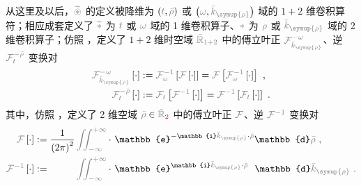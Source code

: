 从这里及以后，$\mathcolor{gray}{\widetilde \circledast}$ 的定义被降维为 $\left( \mathcolor{gray}{t}, \mathcolor{gray}{\bar{\rho}} \right)$ 或 $\left( \mathcolor{gray}{\omega}, \mathcolor{gray}{\bar{k}_{\symup{\rho}}} \right)$ 域的 $1+2$ 维卷积算符；相应成套定义了 $\mathcolor{gray}{\widetilde *}$ 为 $\mathcolor{gray}{t}$ 或 $\mathcolor{gray}{\omega}$ 域的 1 维卷积算子、$\mathcolor{gray}{*}$ 为 $\mathcolor{gray}{\rho}$ 或 $\mathcolor{gray}{\bar{k}_{\symup{\rho}}}$ 域的 2 维卷积算子；仿照 ，定义了 $1+2$ 维时空域 $\mathcolor{gray}{\bar{\mathbb{R}}_{1+2}}$ 中的傅立叶正 $\mathcolor{gray}{\mathcal F_{\bar{k}_{\symup{\rho}}}^{-\omega}}$、逆 $\mathcolor{gray}{\mathcal F^{-\bar{\rho}}_{t}}$ 变换对
\begin{subequations} \label{eq:FT-trho_wkrho}
	\abovedisplayskip=4pt
	\belowdisplayskip=6pt
\begin{align}
	\mathcolor{gray}{\mathcal F_{\bar{k}_{\symup{\rho}}}^{-\omega}} \left[ \cdot \right] &:= \mathcolor{gray}{\mathcal F_{\omega}^{-1}} \left[ \mathcolor{gray}{\mathcal F} \left[ \cdot \right] \right] = \mathcolor{gray}{\mathcal F} \left[ \mathcolor{gray}{\mathcal F_{\omega}^{-1}} \left[ \cdot \right] \right] ~, \label{eq:FT-wkrho} \\
	\mathcolor{gray}{\mathcal F^{-\bar{\rho}}_{t}} \left[ \cdot \right] &:= \mathcolor{gray}{\mathcal F_{t}} \left[ \mathcolor{gray}{\mathcal F^{-1}} \left[ \cdot \right] \right] = \mathcolor{gray}{\mathcal F^{-1}} \left[ \mathcolor{gray}{\mathcal F_{t}} \left[ \cdot \right] \right] ~. \label{eq:IFT-trho}
\end{align}
\end{subequations}
其中，仿照 ，定义了 2 维空域 $\mathcolor{gray}{\bar{\rho}} \in \mathcolor{gray}{\bar{\mathbb{R}}_{\textcolor{Maroon}{2}}}$ 中的傅立叶正 $\mathcolor{gray}{\mathcal F}$、逆 $\mathcolor{gray}{\mathcal F^{-1}}$ 变换对
\begin{subequations} \label{eq:FT-rho_krho}
	\belowdisplayskip=8pt
\begin{align}
	\mathcolor{gray}{\mathcal F} \left[ \cdot \right] &:= \frac{ 1 }{ \left( 2\pi \right)^2 } \mathcolor{gray}{\iint_{-\infty}^{+\infty}} \cdot~ \mathbb{e}^{-\mathbb{i}\mathcolor{gray}{\bar{k}_{\symup{\rho}}} \cdot \mathcolor{gray}{\bar{\rho}}} \mathbb{d}\mathcolor{gray}{\bar{\rho}} ~, \label{eq:FT-krho} \\
	\mathcolor{gray}{\mathcal F^{-1}} \left[ \cdot \right] &:= \hphantom{\frac{ 1 }{ \left( 2\pi \right)^3 }} \mathcolor{gray}{\iint_{-\infty}^{+\infty}} \cdot~ \mathbb{e}^{\mathbb{i}\mathcolor{gray}{\bar{k}_{\symup{\rho}}} \cdot \mathcolor{gray}{\bar{\rho}}} \hphantom{^-} \mathbb{d}\mathcolor{gray}{\bar{k}_{\symup{\rho}}} ~. \label{eq:IFT-rho}
\end{align}
\end{subequations}


